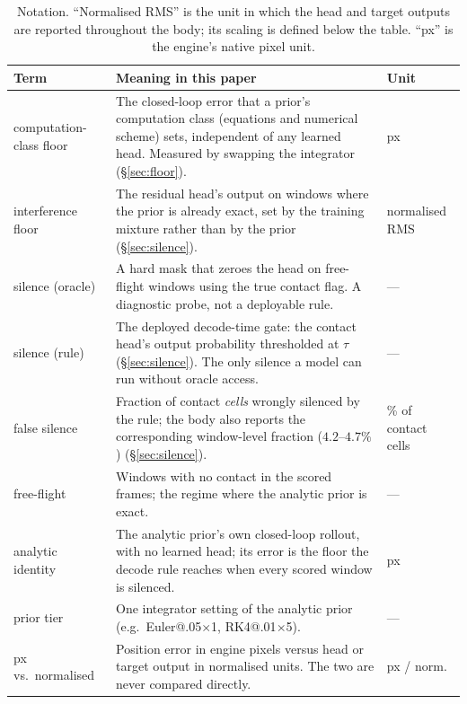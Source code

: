 \documentclass{article}
\begin{document}
\begin{table}[t]
\centering
\caption{Notation. ``Normalised RMS'' is the unit in which the head and target outputs are reported throughout the body; its scaling is defined below the table. ``px'' is the engine's native pixel unit.}
\label{tab:notation}
\small
\begin{tabular}{p{2.6cm}p{6.2cm}p{2.4cm}}
\toprule
Term & Meaning in this paper & Unit \\
\midrule
computation-class floor & The closed-loop error that a prior's computation class (equations and numerical scheme) sets, independent of any learned head. Measured by swapping the integrator (\S\ref{sec:floor}). & px \\
interference floor & The residual head's output on windows where the prior is already exact, set by the training mixture rather than by the prior (\S\ref{sec:silence}). & normalised RMS \\
silence (oracle) & A hard mask that zeroes the head on free-flight windows using the true contact flag. A diagnostic probe, not a deployable rule. & --- \\
silence (rule) & The deployed decode-time gate: the contact head's output probability thresholded at $\tau$ (\S\ref{sec:silence}). The only silence a model can run without oracle access. & --- \\
false silence & Fraction of contact \emph{cells} wrongly silenced by the rule; the body also reports the corresponding window-level fraction ($4.2$--$4.7\%$) (\S\ref{sec:silence}). & \% of contact cells \\
free-flight & Windows with no contact in the scored frames; the regime where the analytic prior is exact. & --- \\
analytic identity & The analytic prior's own closed-loop rollout, with no learned head; its error is the floor the decode rule reaches when every scored window is silenced. & px \\
prior tier & One integrator setting of the analytic prior (e.g.\ Euler@.05$\times$1, RK4@.01$\times$5). & --- \\
px vs.\ normalised & Position error in engine pixels versus head or target output in normalised units. The two are never compared directly. & px / norm. \\
\bottomrule
\end{tabular}
\end{table}
\end{document}
